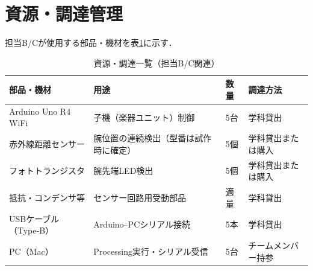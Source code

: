 \section{資源・調達管理}

担当B/Cが使用する部品・機材を表\ref{tab:resources}に示す．

\begin{table}[H]
  \centering
  \begin{tabularx}{\linewidth}{lXll}
    \toprule
    部品・機材 & 用途 & 数量 & 調達方法 \\
    \midrule
    Arduino Uno R4 WiFi &
      子機（楽器ユニット）制御 & 5台 & 学科貸出 \\
    赤外線距離センサー &
      腕位置の連続検出（型番は試作時に確定） & 5個 & 学科貸出または購入 \\
    フォトトランジスタ &
      腕先端LED検出 & 5個 & 学科貸出または購入 \\
    抵抗・コンデンサ等 &
      センサー回路用受動部品 & 適量 & 学科貸出 \\
    USBケーブル（Type-B） &
      Arduino--PCシリアル接続 & 5本 & 学科貸出 \\
    PC（Mac） &
      Processing実行・シリアル受信 & 5台 & チームメンバー持参 \\
    \bottomrule
  \end{tabularx}
  \caption{資源・調達一覧（担当B/C関連）}
  \label{tab:resources}
\end{table}
